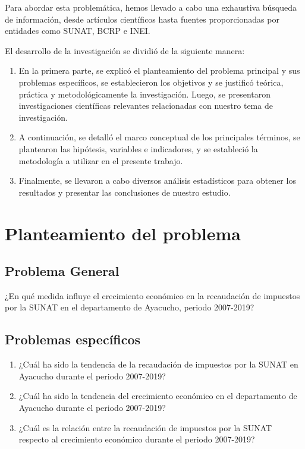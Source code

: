 \documentclass[
  letterpaper,
  DIV=11,
  numbers=noendperiod]{scrartcl}
\begin{document}
Para abordar esta problemática, hemos llevado a cabo una exhaustiva
búsqueda de información, desde artículos científicos hasta fuentes
proporcionadas por entidades como SUNAT, BCRP e INEI.

El desarrollo de la investigación se dividió de la siguiente manera:

\begin{enumerate}
\def\labelenumi{\arabic{enumi}.}
\item
  En la primera parte, se explicó el planteamiento del problema
  principal y sus problemas específicos, se establecieron los objetivos
  y se justificó teórica, práctica y metodológicamente la investigación.
  Luego, se presentaron investigaciones científicas relevantes
  relacionadas con nuestro tema de investigación.
\item
  A continuación, se detalló el marco conceptual de los principales
  términos, se plantearon las hipótesis, variables e indicadores, y se
  estableció la metodología a utilizar en el presente trabajo.
\item
  Finalmente, se llevaron a cabo diversos análisis estadísticos para
  obtener los resultados y presentar las conclusiones de nuestro
  estudio.
\end{enumerate}

\hypertarget{sec-planteamiento-del-problema}{%
\section{Planteamiento del
problema}\label{sec-planteamiento-del-problema}}

\hypertarget{sec-problema-general}{%
\subsection{Problema General}\label{sec-problema-general}}

¿En qué medida influye el crecimiento económico en la recaudación de
impuestos por la SUNAT en el departamento de Ayacucho, periodo
2007-2019?

\hypertarget{sec-problemas-especuxedficos}{%
\subsection{Problemas específicos}\label{sec-problemas-especuxedficos}}

\begin{enumerate}
\def\labelenumi{\arabic{enumi}.}
\item
  ¿Cuál ha sido la tendencia de la recaudación de impuestos por la SUNAT
  en Ayacucho durante el periodo 2007-2019?
\item
  ¿Cuál ha sido la tendencia del crecimiento económico en el
  departamento de Ayacucho durante el periodo 2007-2019?
\item
  ¿Cuál es la relación entre la recaudación de impuestos por la SUNAT
  respecto al crecimiento económico durante el periodo 2007-2019?
\end{enumerate}
\end{document}

